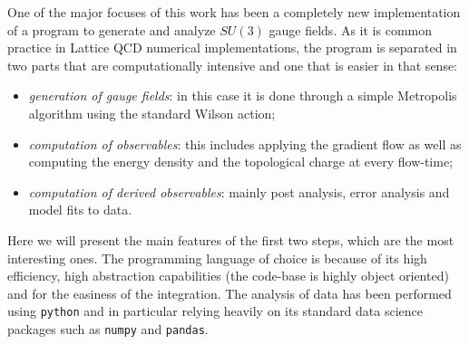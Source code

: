 One of the major focuses of this work has been a completely new implementation of a program to generate and analyze $SU(3)$ gauge fields. As it is common practice in Lattice QCD numerical implementations, the program is separated in two parts that are computationally intensive and one that is easier in that sense:
\begin{itemize}
    \item \textit{generation of gauge fields}: in this case it is done through a simple Metropolis algorithm using the standard Wilson action;
    \item \textit{computation of observables}: this includes applying the gradient flow as well as computing the energy density and the topological charge at every flow-time;
    \item \textit{computation of derived observables}: mainly post analysis, error analysis and model fits to data. 
\end{itemize}
Here we will present the main features of the first two steps, which are the most interesting ones. The programming language of choice is \cpp because of its high efficiency, high abstraction capabilities (the code-base is highly object oriented) and for the easiness of the \mpi integration. The analysis of data has been performed using \texttt{python} and in particular relying heavily on its standard data science packages such as \texttt{numpy} and \texttt{pandas}.
 
